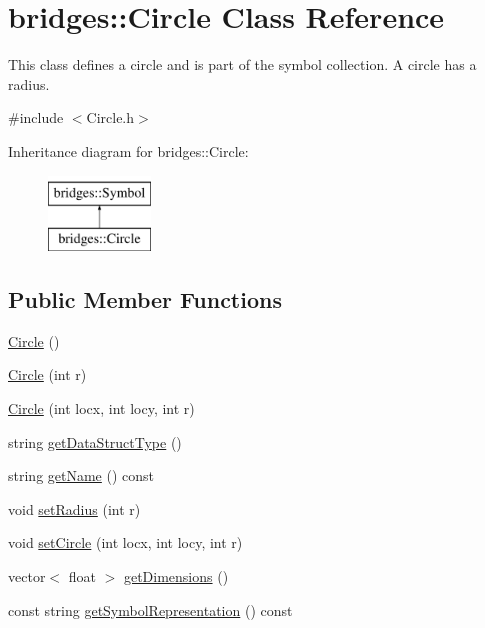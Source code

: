 \hypertarget{classbridges_1_1_circle}{}\section{bridges\+:\+:Circle Class Reference}
\label{classbridges_1_1_circle}


This class defines a circle and is part of the symbol collection. A circle has a radius.  




{\ttfamily \#include $<$Circle.\+h$>$}

Inheritance diagram for bridges\+:\+:Circle\+:\begin{figure}[H]
\begin{center}
\leavevmode
\includegraphics[height=2.000000cm]{classbridges_1_1_circle}
\end{center}
\end{figure}
\subsection*{Public Member Functions}
\begin{DoxyCompactItemize}
\item 
\mbox{\hyperlink{classbridges_1_1_circle_a97471b91ab283daf66e257ba982bf404}{Circle}} ()
\item 
\mbox{\hyperlink{classbridges_1_1_circle_a970e38244503f91ca4003acb183763fb}{Circle}} (int r)
\item 
\mbox{\hyperlink{classbridges_1_1_circle_a09b339c2b9f3ee8dfa95d05cb695bb59}{Circle}} (int locx, int locy, int r)
\item 
string \mbox{\hyperlink{classbridges_1_1_circle_a8a6bc6d07c9c49db3967c741b49be44c}{get\+Data\+Struct\+Type}} ()
\item 
string \mbox{\hyperlink{classbridges_1_1_circle_ae3aba409ad5868406efa736434ada2fa}{get\+Name}} () const
\item 
void \mbox{\hyperlink{classbridges_1_1_circle_a4ddbedd4590cd04692c0be3e760a680c}{set\+Radius}} (int r)
\item 
void \mbox{\hyperlink{classbridges_1_1_circle_a5b3a64ec4e16eb53c7a9415ef435e7ae}{set\+Circle}} (int locx, int locy, int r)
\item 
vector$<$ float $>$ \mbox{\hyperlink{classbridges_1_1_circle_a06e97818128abf9b9caa72aa4d05a704}{get\+Dimensions}} ()
\item 
const string \mbox{\hyperlink{classbridges_1_1_circle_aaee59a0d8ad00c75f7547bac2cfabd38}{get\+Symbol\+Representation}} () const
\end{DoxyCompactItemize}
